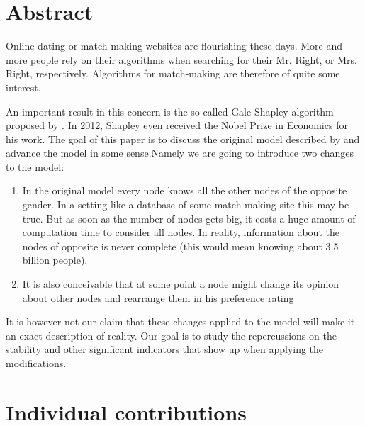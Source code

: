 \documentclass[11pt]{article}
\begin{document}
\newpage

\tableofcontents

\newpage

\setcounter{page}{1} %




\section{Abstract}

Online dating or match-making websites are flourishing these days. More and more people rely on their algorithms when
searching for their Mr. Right, or Mrs. Right, respectively. Algorithms for match-making are therefore of quite some interest.

An important result in this concern is the so-called Gale Shapley algorithm proposed by  \citet{1962}. In 2012, Shapley even received the Nobel
Prize in Economics for his work. The goal of this paper is to discuss the original model described by \citet{1962} and advance the model in some
sense.Namely we are going to introduce two changes to the model:

\begin{enumerate}
  \item In the original model every node knows all the other nodes of the opposite gender. In a setting like a database of some
  match-making site this may be true. But as soon as the number of nodes gets big, it costs a huge amount of computation time to
  consider all nodes. In reality, information about the nodes of opposite is never complete (this would mean knowing about 3.5 billion people).
  \item It is also conceivable that at some point a node might change its opinion about other nodes and rearrange them in his preference rating
\end{enumerate}

It is however not our claim that these changes applied to the model will make it an exact description of reality. Our goal is to study
the repercussions on the stability and other significant indicators that show up when applying the modifications. 

\section{Individual contributions}
\end{document}
